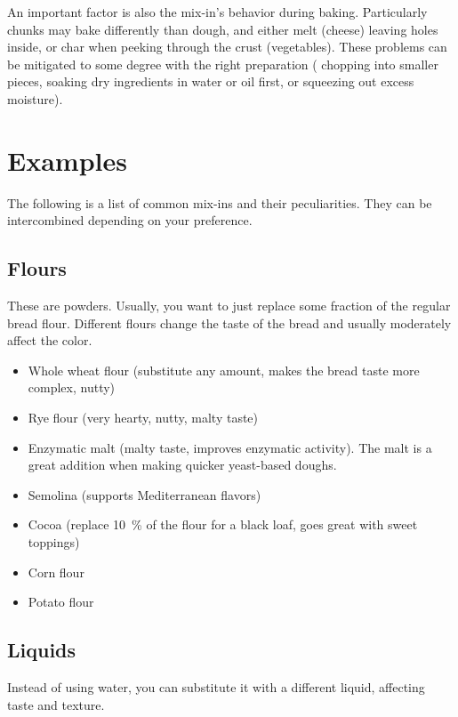 An important factor is also the mix-in's behavior during baking. Particularly
chunks may bake differently than dough, and either melt (cheese) leaving holes
inside, or char when peeking through the crust (\eg vegetables). These
problems can be mitigated to some degree with the right preparation (\eg
chopping into smaller pieces, soaking dry ingredients in water or oil first,
or squeezing out excess moisture).

\section{Examples}

The following is a list of common mix-ins and their peculiarities. They can be
intercombined depending on your preference.

\subsection{Flours}
These are powders. Usually, you want to just replace some fraction of the
regular bread flour. Different flours change the taste of the bread and
usually moderately affect the color.
\begin{itemize}
  \item Whole wheat flour (substitute any amount, makes the bread taste more
      complex, nutty)
  \item Rye flour (very hearty, nutty, malty taste)
  \item Enzymatic malt (malty taste, improves enzymatic activity). The malt is
    a great addition when making quicker yeast-based doughs.
  \item Semolina (supports Mediterranean flavors)
  \item Cocoa (replace \qty{10}{\percent} of the flour for a black loaf, goes
      great with sweet toppings)
  \item Corn flour
  \item Potato flour
\end{itemize}

\subsection{Liquids}

Instead of using water, you can substitute it with a different liquid,
affecting taste and texture.

